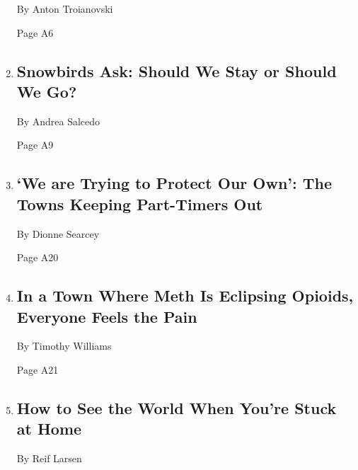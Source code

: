 \begin{enumerate}
  By Anton Troianovski

  Page A6
\item
  \href{/2020/03/26/travel/coronavirus-snowbirds.html}{}

  \hypertarget{snowbirds-ask-should-we-stay-or-should-we-go}{%
  \subsection{Snowbirds Ask: Should We Stay or Should We
  Go?}\label{snowbirds-ask-should-we-stay-or-should-we-go}}

  By Andrea Salcedo

  Page A9
\item
  \href{/2020/03/28/us/politics/coronavirus-second-homes.html}{}

  \hypertarget{we-are-trying-to-protect-our-own-the-towns-keeping-part-timers-out}{%
  \subsection{`We are Trying to Protect Our Own': The Towns Keeping
  Part-Timers
  Out}\label{we-are-trying-to-protect-our-own-the-towns-keeping-part-timers-out}}

  By Dionne Searcey

  Page A20
\item
  \href{/2020/03/28/us/methamphetamine-kentucky-effects.html}{}

  \hypertarget{in-a-town-where-meth-is-eclipsing-opioids-everyone-feels-the-pain}{%
  \subsection{In a Town Where Meth Is Eclipsing Opioids, Everyone Feels
  the
  Pain}\label{in-a-town-where-meth-is-eclipsing-opioids-everyone-feels-the-pain}}

  By Timothy Williams

  Page A21
\item
  \href{/2020/03/24/travel/coronavirus-virtual-travel.html}{}

  \hypertarget{how-to-see-the-world-when-youre-stuck-at-home}{%
  \subsection{How to See the World When You're Stuck at
  Home}\label{how-to-see-the-world-when-youre-stuck-at-home}}

  By Reif Larsen


\end{enumerate}

